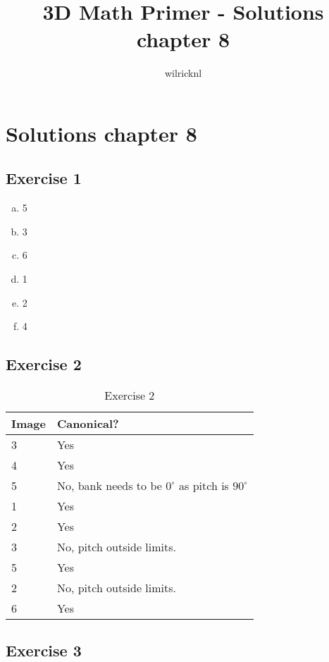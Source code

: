 \documentclass[11pt]{article}
\author{wilricknl}
\title{3D Math Primer - Solutions chapter 8}
\begin{document}
\maketitle

\section{Solutions chapter 8}

\subsection{Exercise 1}

\begin{enumerate}[a.]
	\item 5
	\item 3
	\item 6
	\item 1
	\item 2
	\item 4
\end{enumerate}

\subsection{Exercise 2}

\begin{table}[H]
\centering
\begin{tabular}{|l|l|}
\hline
\textbf{Image} & \textbf{Canonical?} \\ \hline
3 & Yes \\ \hline %
4 & Yes \\ \hline %
5 & No, bank needs to be $0^\circ$ as pitch is $90^\circ$ \\ \hline %
1 & Yes \\ \hline %
2 & Yes \\ \hline %
3 & No, pitch outside limits. \\ \hline %
5 & Yes \\ \hline %
2 & No, pitch outside limits. \\ \hline %
6 & Yes \\ \hline %
\end{tabular}
\caption{Exercise 2}
\label{tab:08-exercise-02}
\end{table}

\subsection{Exercise 3}
\end{document}
